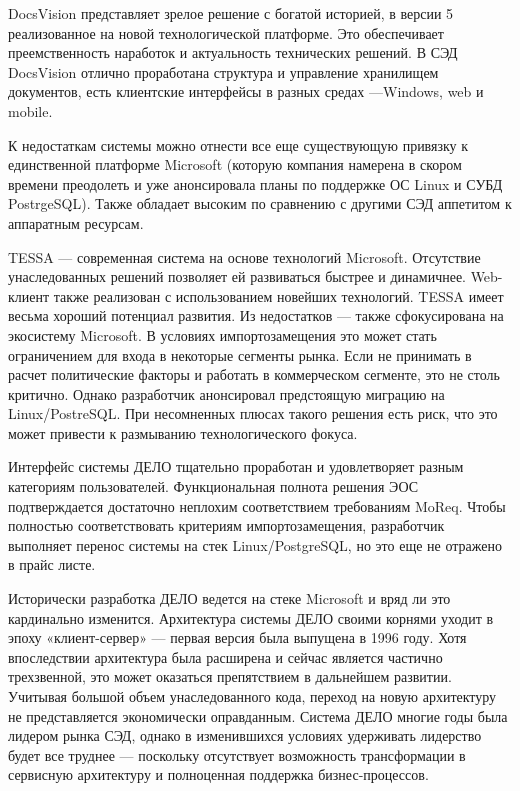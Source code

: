DocsVision представляет зрелое решение с богатой историей, в версии 5 реализованное на новой технологической платформе. Это обеспечивает преемственность наработок и актуальность технических решений. В СЭД DocsVision отлично проработана структура и управление хранилищем документов, есть клиентские интерфейсы в разных средах —Windows, web и mobile.

К недостаткам системы можно отнести все еще существующую привязку к единственной платформе Microsoft (которую компания намерена в скором времени преодолеть и уже анонсировала планы по поддержке ОС Linux и СУБД PostrgeSQL). Также обладает высоким по сравнению с другими СЭД аппетитом к аппаратным ресурсам.

TESSA — современная система на основе технологий Microsoft. Отсутствие унаследованных решений позволяет ей развиваться быстрее и динамичнее. Web-клиент также реализован с использованием новейших технологий. TESSA имеет весьма хороший потенциал развития. Из недостатков — также сфокусирована на экосистему Microsoft. В условиях импортозамещения это может стать ограничением для входа в некоторые сегменты рынка. Если не принимать в расчет политические факторы и работать в коммерческом сегменте, это не столь критично. Однако разработчик анонсировал предстоящую миграцию на Linux/PostreSQL. При несомненных плюсах такого решения есть риск, что это может привести к размыванию технологического фокуса. 

Интерфейс системы ДЕЛО тщательно проработан и удовлетворяет разным категориям пользователей. Функциональная полнота решения ЭОС подтверждается достаточно неплохим соответствием требованиям MoReq. Чтобы полностью соответствовать критериям импортозамещения, разработчик выполняет перенос системы на стек Linux/PostgreSQL, но это еще не отражено в прайс листе.

Исторически разработка ДЕЛО ведется на стеке Microsoft и вряд ли это кардинально изменится. Архитектура системы ДЕЛО своими корнями уходит в эпоху «клиент-сервер» — первая версия была выпущена в 1996 году. Хотя впоследствии архитектура была расширена и сейчас является частично трехзвенной, это может оказаться препятствием в дальнейшем развитии. Учитывая большой объем унаследованного кода, переход на новую архитектуру не представляется экономически оправданным.
Система ДЕЛО многие годы была лидером рынка СЭД, однако в изменившихся условиях удерживать лидерство будет все труднее — поскольку отсутствует возможность трансформации в сервисную архитектуру и полноценная поддержка бизнес-процессов.

